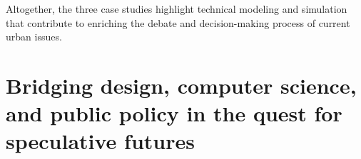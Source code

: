 Altogether, the three case studies highlight technical modeling and simulation that contribute to enriching the debate and decision-making process of current urban issues. 

\section[Bridging Design, Computer Sc. \& Policy for speculative futures]{Bridging design, computer science, and public policy in the quest for speculative futures}


